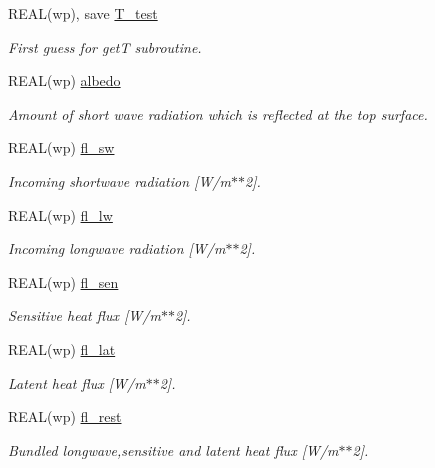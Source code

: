\begin{DoxyCompactItemize}
REAL(wp), save \hyperlink{namespacemo__data_a7b3b4a04c1efd94e6c3f21e9bfd5fdad}{T\_\-test}
\begin{DoxyCompactList}\small\item\em First guess for getT subroutine. \item\end{DoxyCompactList}\item 
REAL(wp) \hyperlink{namespacemo__data_a4e0875d21076b42177bdff28faf75a53}{albedo}
\begin{DoxyCompactList}\small\item\em Amount of short wave radiation which is reflected at the top surface. \item\end{DoxyCompactList}\item 
REAL(wp) \hyperlink{namespacemo__data_a848f22357479c2be98599195b61991f7}{fl\_\-sw}
\begin{DoxyCompactList}\small\item\em Incoming shortwave radiation \mbox{[}W/m$\ast$$\ast$2\mbox{]}. \item\end{DoxyCompactList}\item 
REAL(wp) \hyperlink{namespacemo__data_a0224a603e8070ac503b13ae82c8e6b99}{fl\_\-lw}
\begin{DoxyCompactList}\small\item\em Incoming longwave radiation \mbox{[}W/m$\ast$$\ast$2\mbox{]}. \item\end{DoxyCompactList}\item 
REAL(wp) \hyperlink{namespacemo__data_a46e3fef58a1955a30678d73ddc044c9a}{fl\_\-sen}
\begin{DoxyCompactList}\small\item\em Sensitive heat flux \mbox{[}W/m$\ast$$\ast$2\mbox{]}. \item\end{DoxyCompactList}\item 
REAL(wp) \hyperlink{namespacemo__data_a63a4e3f74d04640c4f4522a9f22390e0}{fl\_\-lat}
\begin{DoxyCompactList}\small\item\em Latent heat flux \mbox{[}W/m$\ast$$\ast$2\mbox{]}. \item\end{DoxyCompactList}\item 
REAL(wp) \hyperlink{namespacemo__data_afedf60f1ea1272e55a3d6110e0911102}{fl\_\-rest}
\begin{DoxyCompactList}\small\item\em Bundled longwave,sensitive and latent heat flux \mbox{[}W/m$\ast$$\ast$2\mbox{]}. \item\end{DoxyCompactList}\item 

\end{DoxyCompactItemize}
